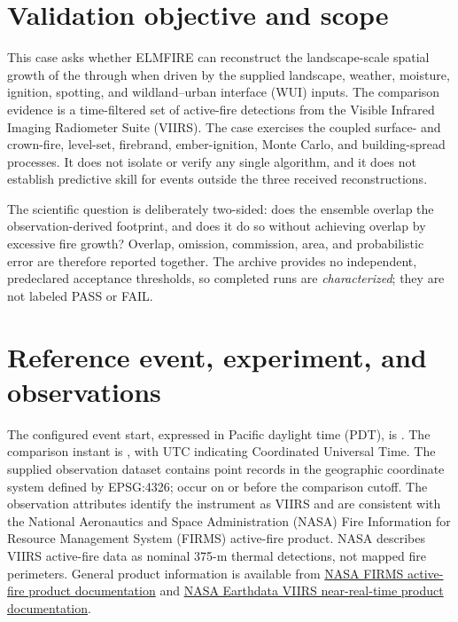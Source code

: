 \section{Validation objective and scope}

This case asks whether ELMFIRE can reconstruct the landscape-scale spatial
growth of the \CaseTitle{} through \SimulationDuration{} when driven by the
supplied landscape, weather, moisture, ignition, spotting, and wildland--urban
interface (WUI) inputs.  The comparison evidence is a time-filtered set of active-fire detections from the
Visible Infrared Imaging Radiometer Suite (VIIRS).
The case exercises the coupled surface- and crown-fire, level-set, firebrand,
ember-ignition, Monte Carlo, and building-spread processes.  It does not isolate
or verify any single algorithm, and it does not establish predictive skill for
events outside the three received reconstructions.

The scientific question is deliberately two-sided: does the ensemble overlap
the observation-derived footprint, and does it do so without achieving overlap
by excessive fire growth?  Overlap, omission, commission, area, and
probabilistic error are therefore reported together.  The archive provides no
independent, predeclared acceptance thresholds, so completed runs are
\emph{characterized}; they are not labeled PASS or FAIL.

\section{Reference event, experiment, and observations}

The configured event start, expressed in Pacific daylight time (PDT), is
\EventStart{}. The comparison instant is \ComparisonTime{}, with UTC
indicating Coordinated Universal Time.  The supplied observation dataset contains
 point records in the
geographic coordinate system defined by EPSG:4326;  occur
on or before the comparison cutoff.  The observation attributes identify the instrument
as VIIRS and are consistent
with the National Aeronautics and Space Administration (NASA) Fire Information
for Resource Management System (FIRMS) active-fire product.  NASA describes VIIRS
active-fire data as nominal 375-m thermal detections, not mapped fire
perimeters.  General product information is available from
\href{https://firms.modaps.eosdis.nasa.gov/active_fire/}{NASA FIRMS active-fire product documentation} and
\href{https://www.earthdata.nasa.gov/data/catalog/lancemodis-vnp14img-nrt-2}{NASA Earthdata VIIRS near-real-time product documentation}.

